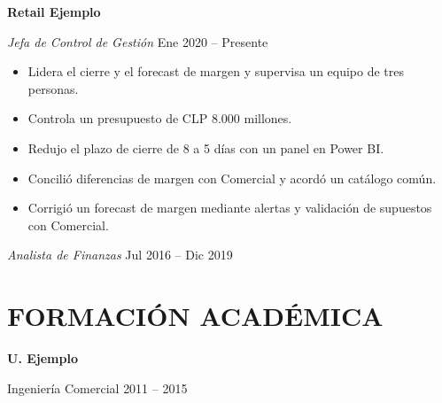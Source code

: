 \documentclass[10pt,a4paper]{article}
\newcommand{\entidad}[2]{%
    \noindent
    \textbf{#1}\hfill
    {\small\color{secundario}#2}\par
}
\newcommand{\cargo}[2]{%
    \noindent
    \textit{#1}\hfill
    {\small\color{secundario}#2}\par
}
\newcommand{\programa}[2]{%
    \noindent
    #1\hfill
    {\small\color{secundario}#2}\par
}
\begin{document}
\entidad{Retail Ejemplo}{}
\cargo{Jefa de Control de Gestión}{Ene 2020 -- Presente}

\begin{itemize}
    \item Lidera el cierre y el forecast de margen y supervisa un equipo de tres personas.
    \item Controla un presupuesto de CLP 8.000 millones.
    \item Redujo el plazo de cierre de 8 a 5 días con un panel en Power BI.
    \item Concilió diferencias de margen con Comercial y acordó un catálogo común.
    \item Corrigió un forecast de margen mediante alertas y validación de supuestos con Comercial.
\end{itemize}

\vspace{5pt}

\cargo{Analista de Finanzas}{Jul 2016 -- Dic 2019}

\section{FORMACIÓN ACADÉMICA}

\entidad{U. Ejemplo}{}
\programa{Ingeniería Comercial}{2011 -- 2015}
\end{document}
